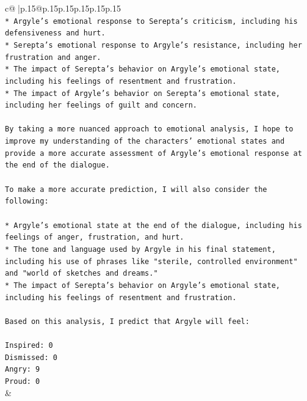\documentclass{article}
\begin{document}
{\begin{supertabular}{c@{$\;$}|p{.15\linewidth}@{}p{.15\linewidth}p{.15\linewidth}p{.15\linewidth}p{.15\linewidth}p{.15\linewidth}}
{{{\\ 
\texttt{* Argyle's emotional response to Serepta's criticism, including his defensiveness and hurt.} \\
\texttt{* Serepta's emotional response to Argyle's resistance, including her frustration and anger.} \\
\texttt{* The impact of Serepta's behavior on Argyle's emotional state, including his feelings of resentment and frustration.} \\
\texttt{* The impact of Argyle's behavior on Serepta's emotional state, including her feelings of guilt and concern.} \\
\\ 
\texttt{By taking a more nuanced approach to emotional analysis, I hope to improve my understanding of the characters' emotional states and provide a more accurate assessment of Argyle's emotional response at the end of the dialogue.} \\
\\ 
\texttt{To make a more accurate prediction, I will also consider the following:} \\
\\ 
\texttt{* Argyle's emotional state at the end of the dialogue, including his feelings of anger, frustration, and hurt.} \\
\texttt{* The tone and language used by Argyle in his final statement, including his use of phrases like "sterile, controlled environment" and "world of sketches and dreams."} \\
\texttt{* The impact of Serepta's behavior on Argyle's emotional state, including his feelings of resentment and frustration.} \\
\\ 
\texttt{Based on this analysis, I predict that Argyle will feel:} \\
\\ 
\texttt{Inspired: 0} \\
\texttt{Dismissed: 0} \\
\texttt{Angry: 9} \\
\texttt{Proud: 0} \\
            }
        }
    }
    & \\ \\

\end{supertabular}
}
\end{document}
